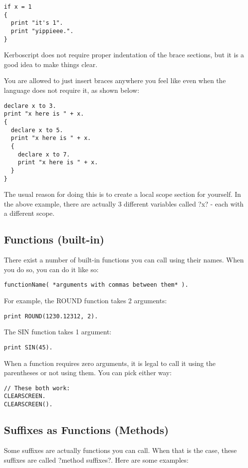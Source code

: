 \begin{Verbatim}[frame=single]
if x = 1
{
  print "it's 1".
  print "yippieee.".
}
\end{Verbatim}

Kerboscript does not require proper indentation of the brace sections, but it is a good idea to make things clear.

You are allowed to just insert braces anywhere you feel like even when the language does not require it, as shown below:

\begin{Verbatim}[frame=single]
declare x to 3.
print "x here is " + x.
{
  declare x to 5.
  print "x here is " + x.
  {
    declare x to 7.
    print "x here is " + x.
  }
}
\end{Verbatim}

The usual reason for doing this is to create a local scope section for yourself. In the above example, there are actually 3 different variables called ?x? - each with a different scope.

\subsection{Functions (built-in)}
There exist a number of built-in functions you can call using their names. When you do so, you can do it like so:

\begin{Verbatim}[frame=single]
functionName( *arguments with commas between them* ).
\end{Verbatim}

For example, the ROUND function takes 2 arguments:

\begin{Verbatim}[frame=single]
print ROUND(1230.12312, 2).
\end{Verbatim}

The SIN function takes 1 argument:

\begin{Verbatim}[frame=single]
print SIN(45).
\end{Verbatim}

When a function requires zero arguments, it is legal to call it using the parentheses or not using them. You can pick either way:

\begin{Verbatim}[frame=single]
// These both work:
CLEARSCREEN.
CLEARSCREEN().
\end{Verbatim}

\subsection{Suffixes as Functions (Methods)}
Some suffixes are actually functions you can call. When that is the case, these suffixes are called ?method suffixes?. Here are some examples:

